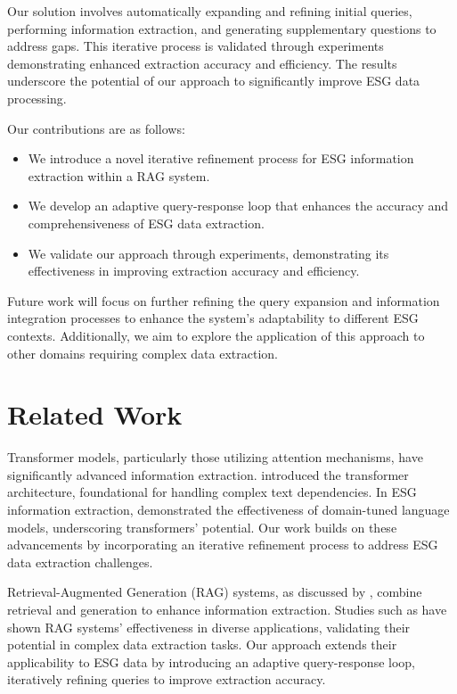 \documentclass{article} %
\begin{document}
Our solution involves automatically expanding and refining initial queries, performing information extraction, and generating supplementary questions to address gaps. This iterative process is validated through experiments demonstrating enhanced extraction accuracy and efficiency. The results underscore the potential of our approach to significantly improve ESG data processing.

Our contributions are as follows:
\begin{itemize}
    \item We introduce a novel iterative refinement process for ESG information extraction within a RAG system.
    \item We develop an adaptive query-response loop that enhances the accuracy and comprehensiveness of ESG data extraction.
    \item We validate our approach through experiments, demonstrating its effectiveness in improving extraction accuracy and efficiency.
\end{itemize}

Future work will focus on further refining the query expansion and information integration processes to enhance the system's adaptability to different ESG contexts. Additionally, we aim to explore the application of this approach to other domains requiring complex data extraction.

\section{Related Work}
\label{sec:related}

Transformer models, particularly those utilizing attention mechanisms, have significantly advanced information extraction. \citet{vaswani2017attention} introduced the transformer architecture, foundational for handling complex text dependencies. In ESG information extraction, \citet{Lee2023ESGIE} demonstrated the effectiveness of domain-tuned language models, underscoring transformers' potential. Our work builds on these advancements by incorporating an iterative refinement process to address ESG data extraction challenges.

Retrieval-Augmented Generation (RAG) systems, as discussed by \citet{radford2019language}, combine retrieval and generation to enhance information extraction. Studies such as \citet{Lyu2024CRUDRAGAC} have shown RAG systems' effectiveness in diverse applications, validating their potential in complex data extraction tasks. Our approach extends their applicability to ESG data by introducing an adaptive query-response loop, iteratively refining queries to improve extraction accuracy.
\end{document}
